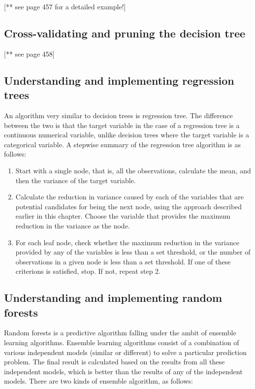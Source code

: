 \documentclass{article}
\numberwithin{equation}{section} %
\begin{document}
[** see page 457 for a detailed example!]


\subsection*{Cross-validating and pruning the decision tree}

[** see page 458]


\subsection*{Understanding and implementing regression trees}

An algorithm very similar to decision trees is regression tree. The difference
between the two is that the target variable in the case of a regression tree is a
continuous numerical variable, unlike decision trees where the target variable
is a categorical variable. A stepwise summary of the regression tree algorithm is as follows:

\begin{enumerate}
	\item Start with a single node, that is, all the observations, calculate the mean, and then the variance of the target variable.
	\item Calculate the reduction in variance caused by each of the variables that are potential candidates for being the next node, using the approach described
	earlier in this chapter. Choose the variable that provides the maximum reduction in the variance as the node.
	\item For each leaf node, check whether the maximum reduction in the variance
	provided by any of the variables is less than a set threshold, or the number
	of observations in a given node is less than a set threshold. If one of these
	criterions is satisfied, stop. If not, repeat step 2.
\end{enumerate}


\subsection*{Understanding and implementing random forests}

Random forests is a predictive algorithm falling under the ambit of ensemble
learning algorithms. Ensemble learning algorithms consist of a combination of
various independent models (similar or different) to solve a particular prediction
problem. The final result is calculated based on the results from all these
independent models, which is better than the results of any of the independent models. There are two kinds of ensemble algorithm, as follows:
\end{document}
